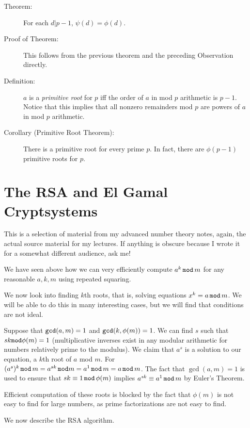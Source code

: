 \documentclass[12pt]{article}
\begin{document}
\begin{description}
\item[Theorem:]   For each $d|p-1$, $\psi(d)=\phi(d)$.

\item[Proof of Theorem:]   This follows from the previous theorem and the preceding Observation directly.

\item[Definition:]  $a$ is a {\em primitive root\/} for $p$ iff the order of $a$ in mod $p$ arithmetic is $p-1$.   Notice that this implies that all nonzero remainders mod $p$ are powers of $a$ in mod $p$ arithmetic.

\item[Corollary (Primitive Root Theorem):]  There is a primitive root for every prime $p$.  In fact, there are $\phi(p-1)$ primitive roots for $p$.

\end{description}
\section{The RSA and El Gamal Cryptsystems}

This is a selection of material from my advanced number theory notes, again, the actual source material for my lectures.  If anything is obscure because I wrote it for a somewhat different audience, ask me!

We have seen above how we can very efficiently compute $a^k\,{\tt mod}\,m$ for any reasonable $a,k,m$ using repeated squaring.

We now look into finding $k$th roots, that is, solving equations $x^k=a\,{\tt mod}\,m$.   We will be able to do this in many interesting cases, but we will find that conditions are not ideal.

Suppose that ${\tt gcd}(a,m)=1$ and ${\tt gcd}(k,\phi(m))=1$.   We can find $s$ such that $sk {\tt mod} \phi(m)=1$ (multiplicative inverses exist in any modular arithmetic for numbers relatively prime to the modulus).
We claim that $a^s$ is a solution to our equation, a $k$th root of $a$ mod $m$.   For $(a^s)^k \,{\tt mod}\,m=a^{sk} \, {\tt mod} m = a^1 \,{\tt mod}\, m = a \,{\tt mod}\, m$.   The fact that ${\gcd}(a,m)=1$
 is used to ensure that $sk\equiv 1\,{\tt mod}\,\phi(m)$ implies $a^{sk} \equiv a^1\,{\tt mod}\, m$ by Euler's Theorem.

Efficient computation of these roots is blocked by the fact that $\phi(m)$ is not easy to find for large numbers, as prime factorizations are not easy to find.


We now describe the RSA algorithm.
\end{document}
